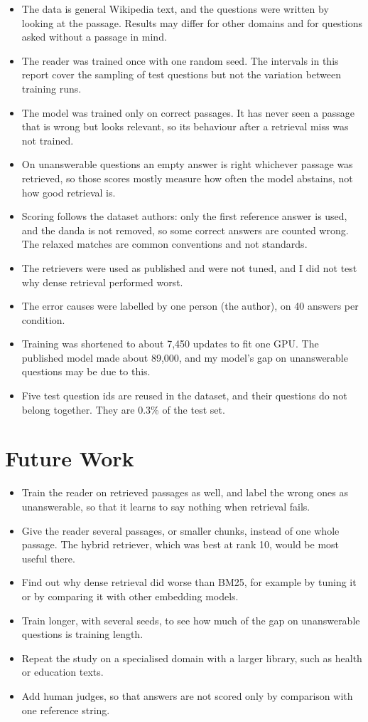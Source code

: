 \begin{itemize}
	\item The data is general Wikipedia text, and the questions were written by looking at the passage. Results may differ for other domains and for questions asked without a passage in mind.
	\item The reader was trained once with one random seed. The intervals in this report cover the sampling of test questions but not the variation between training runs.
	\item The model was trained only on correct passages. It has never seen a passage that is wrong but looks relevant, so its behaviour after a retrieval miss was not trained.
	\item On unanswerable questions an empty answer is right whichever passage was retrieved, so those scores mostly measure how often the model abstains, not how good retrieval is.
	\item Scoring follows the dataset authors: only the first reference answer is used, and the danda is not removed, so some correct answers are counted wrong. The relaxed matches are common conventions and not standards.
	\item The retrievers were used as published and were not tuned, and I did not test why dense retrieval performed worst.
	\item The error causes were labelled by one person (the author), on 40 answers per condition.
	\item Training was shortened to about 7,450 updates to fit one GPU. The published model made about 89,000, and my model's gap on unanswerable questions may be due to this.
	\item Five test question ids are reused in the dataset, and their questions do not belong together. They are 0.3\% of the test set.
\end{itemize}

\section{Future Work}

\begin{itemize}
	\item Train the reader on retrieved passages as well, and label the wrong ones as unanswerable, so that it learns to say nothing when retrieval fails.
	\item Give the reader several passages, or smaller chunks, instead of one whole passage. The hybrid retriever, which was best at rank 10, would be most useful there.
	\item Find out why dense retrieval did worse than BM25, for example by tuning it or by comparing it with other embedding models.
	\item Train longer, with several seeds, to see how much of the gap on unanswerable questions is training length.
	\item Repeat the study on a specialised domain with a larger library, such as health or education texts.
	\item Add human judges, so that answers are not scored only by comparison with one reference string.
\end{itemize}
